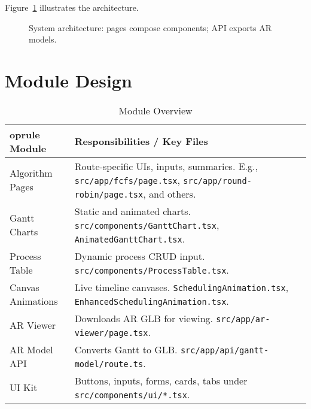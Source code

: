\documentclass[12pt,a4paper,oneside]{report}
\begin{document}
Figure~\ref{fig:arch} illustrates the architecture.

\begin{figure}[H]
  \centering
  \caption{System architecture: pages compose components; API exports AR models.}
  \label{fig:arch}
\end{figure}

\section{Module Design}
\begin{table}[H]
  \centering
  \caption{Module Overview}
  \begin{tabular}{p{} p{}}
    	oprule
    Module & Responsibilities / Key Files \\
    \midrule
    Algorithm Pages & Route-specific UIs, inputs, summaries. E.g., \verb|src/app/fcfs/page.tsx|, \verb|src/app/round-robin/page.tsx|, and others. \\
    Gantt Charts & Static and animated charts. \verb|src/components/GanttChart.tsx|, \verb|AnimatedGanttChart.tsx|. \\
    Process Table & Dynamic process CRUD input. \verb|src/components/ProcessTable.tsx|. \\
    Canvas Animations & Live timeline canvases. \verb|SchedulingAnimation.tsx|, \verb|EnhancedSchedulingAnimation.tsx|. \\
    AR Viewer & Downloads AR GLB for viewing. \verb|src/app/ar-viewer/page.tsx|. \\
    AR Model API & Converts Gantt to GLB. \verb|src/app/api/gantt-model/route.ts|. \\
    UI Kit & Buttons, inputs, forms, cards, tabs under \verb|src/components/ui/*.tsx|. \\
    \bottomrule
  \end{tabular}
\end{table}
\end{document}
